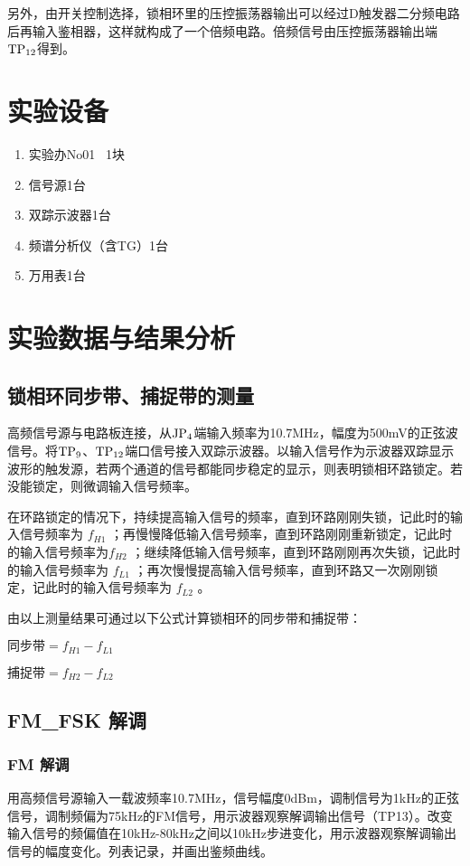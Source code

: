 \documentclass{../source/Experiment}
\begin{document}
另外，由开关控制选择，锁相环里的压控振荡器输出可以经过D触发器二分频电路后再输入鉴相器，这样就构成了一个倍频电路。倍频信号由压控振荡器输出端$ \rm TP_{12}$得到。



\section{实验设备}
\begin{enumerate}
    \item 实验办No01 \, 1块
    \item 信号源1台
    \item 双踪示波器1台
    \item 频谱分析仪（含TG）1台
    \item 万用表1台
\end{enumerate}

\section{实验数据与结果分析}
\subsection{锁相环同步带、捕捉带的测量}

高频信号源与电路板连接，从$\rm JP_4$端输入频率为10.7MHz，幅度为500mV的正弦波信号。将$\rm TP_9$、$\rm TP_{12}$端口信号接入双踪示波器。以输入信号作为示波器双踪显示波形的触发源，若两个通道的信号都能同步稳定的显示，则表明锁相环路锁定。若没能锁定，则微调输入信号频率。

在环路锁定的情况下，持续提高输入信号的频率，直到环路刚刚失锁，记此时的输入信号频率为 $f_{H1}$ ；再慢慢降低输入信号频率，直到环路刚刚重新锁定，记此时的输入信号频率为$f_{H2}$ ；继续降低输入信号频率，直到环路刚刚再次失锁，记此时的输入信号频率为 $f_{L1}$ ；再次慢慢提高输入信号频率，直到环路又一次刚刚锁定，记此时的输入信号频率为 $f_{L2}$ 。

由以上测量结果可通过以下公式计算锁相环的同步带和捕捉带：

$
    \mbox{同步带} = f_{H1} - f_{L1}
$

$
    \mbox{捕捉带} = f_{H2} - f_{L2}
$

\subsection{FM\_FSK 解调 }
\subsubsection{FM 解调}
用高频信号源输入一载波频率10.7MHz，信号幅度0dBm，调制信号为1kHz的正弦信号，调制频偏为75kHz的FM信号，用示波器观察解调输出信号（TP13）。改变输入信号的频偏值在10kHz-80kHz之间以10kHz步进变化，用示波器观察解调输出信号的幅度变化。列表记录，并画出鉴频曲线。
\end{document}
